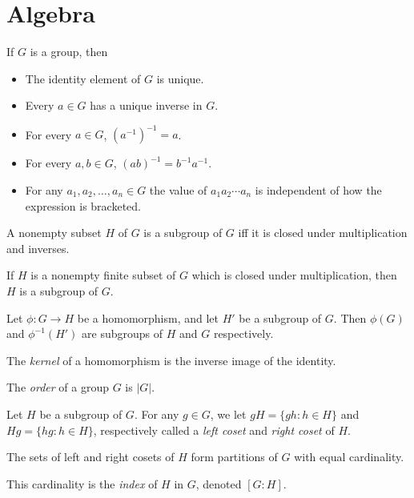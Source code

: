 \section{Algebra}
\begin{prop}
    If $G$ is a group, then
    \begin{itemize}
        \item The identity element of $G$ is unique.
        \item Every $a\in G$ has a unique inverse in $G$.
        \item For every $a\in G$, $(a^{-1})^{-1}=a$.
        \item For every $a,b\in G$, $(ab)^{-1}=b^{-1}a^{-1}$.
        \item For any $a_1,a_2,\ldots,a_n\in G$ the value of $a_1 a_2\cdots a_n$
            is independent of how the expression is bracketed.
    \end{itemize}
\end{prop}
\begin{prop}
    A nonempty subset $H$ of $G$ is a subgroup of $G$ iff it is closed under
    multiplication and inverses.
\end{prop}
\begin{prop}
    If $H$ is a nonempty finite subset of $G$ which is closed under
    multiplication, then $H$ is a subgroup of $G$.
\end{prop}
\begin{prop}
    Let $\phi:G\to H$ be a homomorphism, and let $H'$ be a subgroup of $G$.
    Then $\phi(G)$ and $\phi^{-1}(H')$ are subgroups
    of $H$ and $G$ respectively.
\end{prop}
\begin{defn}
    The \emph{kernel} of a homomorphism is the inverse image of the identity.
\end{defn}
\begin{defn}
    The \emph{order} of a group $G$ is $|G|$.
\end{defn}
\begin{defn}
    Let $H$ be a subgroup of $G$. For any $g\in G$, we let $gH=\{gh:h\in H\}$
    and $Hg=\{hg:h\in H\}$, respectively called a \emph{left coset} and
    \emph{right coset} of $H$.
\end{defn}
\begin{prop}
    The sets of left and right cosets of $H$ form partitions of $G$ with equal
    cardinality.
\end{prop}
\begin{defn}
    This cardinality is the \emph{index} of $H$ in $G$, denoted $[G:H]$.
\end{defn}
